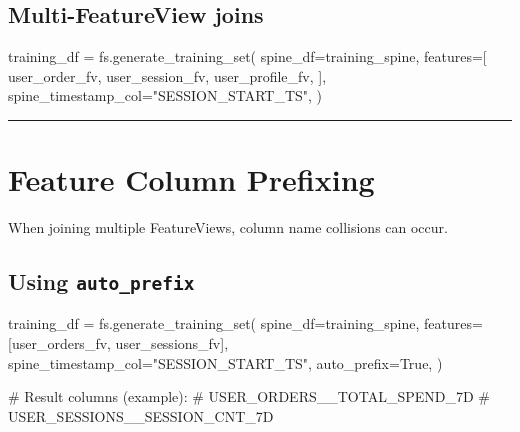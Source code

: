 \documentclass[
  letterpaper,
  DIV=11,
  numbers=noendperiod]{scrreprt}
\newenvironment{Shaded}{\begin{snugshade}}{\end{snugshade}}
\newcommand{\CommentTok}[1]{\textcolor[rgb]{0.37,0.37,0.37}{#1}}
\newcommand{\NormalTok}[1]{\textcolor[rgb]{0.00,0.23,0.31}{#1}}
\newcommand{\OperatorTok}[1]{\textcolor[rgb]{0.37,0.37,0.37}{#1}}
\newcommand{\StringTok}[1]{\textcolor[rgb]{0.13,0.47,0.30}{#1}}
\newcommand{\VariableTok}[1]{\textcolor[rgb]{0.07,0.07,0.07}{#1}}
\begin{document}
\hypertarget{multi-featureview-joins}{%
\subsection{Multi-FeatureView joins}\label{multi-featureview-joins}}

\begin{Shaded}
\begin{Highlighting}[]
\NormalTok{training\_df }\OperatorTok{=}\NormalTok{ fs.generate\_training\_set(}
\NormalTok{    spine\_df}\OperatorTok{=}\NormalTok{training\_spine,}
\NormalTok{    features}\OperatorTok{=}\NormalTok{[}
\NormalTok{        user\_order\_fv,}
\NormalTok{        user\_session\_fv,}
\NormalTok{        user\_profile\_fv,}
\NormalTok{    ],}
\NormalTok{    spine\_timestamp\_col}\OperatorTok{=}\StringTok{"SESSION\_START\_TS"}\NormalTok{,}
\NormalTok{)}
\end{Highlighting}
\end{Shaded}

\begin{center}\rule{0.5\linewidth}{0.5pt}\end{center}

\hypertarget{sec-prefixing}{%
\section{Feature Column Prefixing}\label{sec-prefixing}}

When joining multiple FeatureViews, column name collisions can occur.

\hypertarget{using-auto_prefix}{%
\subsection{\texorpdfstring{Using
\texttt{auto\_prefix}}{Using auto\_prefix}}\label{using-auto_prefix}}

\begin{Shaded}
\begin{Highlighting}[]
\NormalTok{training\_df }\OperatorTok{=}\NormalTok{ fs.generate\_training\_set(}
\NormalTok{    spine\_df}\OperatorTok{=}\NormalTok{training\_spine,}
\NormalTok{    features}\OperatorTok{=}\NormalTok{[user\_orders\_fv, user\_sessions\_fv],}
\NormalTok{    spine\_timestamp\_col}\OperatorTok{=}\StringTok{"SESSION\_START\_TS"}\NormalTok{,}
\NormalTok{    auto\_prefix}\OperatorTok{=}\VariableTok{True}\NormalTok{,}
\NormalTok{)}

\CommentTok{\# Result columns (example):}
\CommentTok{\# USER\_ORDERS\_\_TOTAL\_SPEND\_7D}
\CommentTok{\# USER\_SESSIONS\_\_SESSION\_CNT\_7D}
\end{Highlighting}
\end{Shaded}
\end{document}
